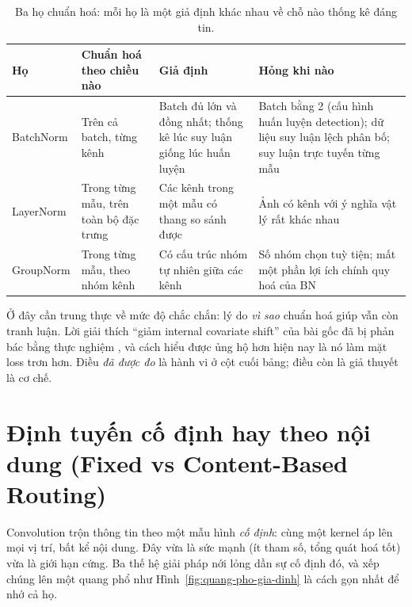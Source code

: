 \documentclass[../../deep_learning.tex]{subfiles}
\begin{document}
\begin{table}[H]\centering\small
\caption{Ba họ chuẩn hoá: mỗi họ là một giả định khác nhau về chỗ nào thống kê đáng tin.}
\label{tab:norm}
\begin{tabularx}{\linewidth}{@{}L{2.4cm}L{3.9cm}YL{3.5cm}@{}}
\toprule
\textbf{Họ} & \textbf{Chuẩn hoá theo chiều nào} & \textbf{Giả định} & \textbf{Hỏng khi nào}\\
\midrule
BatchNorm \cite{ioffe2015batchnorm} & Trên cả batch, từng kênh & Batch đủ lớn và đồng nhất; thống kê lúc suy luận giống lúc huấn luyện & Batch bằng 2 (cấu hình huấn luyện detection); dữ liệu suy luận lệch phân bố; suy luận trực tuyến từng mẫu\\
LayerNorm \cite{ba2016layernorm} & Trong từng mẫu, trên toàn bộ đặc trưng & Các kênh trong một mẫu có thang so sánh được & Ảnh có kênh với ý nghĩa vật lý rất khác nhau\\
GroupNorm \cite{wu2018groupnorm} & Trong từng mẫu, theo nhóm kênh & Có cấu trúc nhóm tự nhiên giữa các kênh & Số nhóm chọn tuỳ tiện; mất một phần lợi ích chính quy hoá của BN\\
\bottomrule
\end{tabularx}
\end{table}

Ở đây cần trung thực về mức độ chắc chắn: lý do \emph{vì sao} chuẩn hoá giúp vẫn còn tranh luận. Lời giải thích ``giảm internal covariate shift'' của bài gốc đã bị phản bác bằng thực nghiệm \cite{santurkar2018how}, và cách hiểu được ủng hộ hơn hiện nay là nó làm mặt loss trơn hơn. Điều \emph{đã được đo} là hành vi ở cột cuối bảng; điều còn là giả thuyết là cơ chế.

\section{Định tuyến cố định hay theo nội dung (Fixed vs Content-Based Routing)}

Convolution trộn thông tin theo một mẫu hình \emph{cố định}: cùng một kernel áp lên mọi vị trí, bất kể nội dung. Đây vừa là sức mạnh (ít tham số, tổng quát hoá tốt) vừa là giới hạn cứng. Ba thế hệ giải pháp nới lỏng dần sự cố định đó, và xếp chúng lên một quang phổ như Hình~\ref{fig:quang-pho-gia-dinh} là cách gọn nhất để nhớ cả họ.
\end{document}
